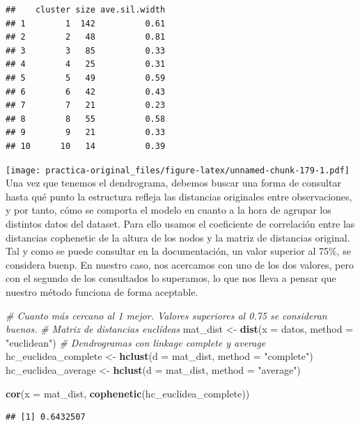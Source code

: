\documentclass[spanish,]{article}
\newenvironment{Shaded}{\begin{snugshade}}{\end{snugshade}}
\newcommand{\KeywordTok}[1]{\textcolor[rgb]{0.13,0.29,0.53}{\textbf{#1}}}
\newcommand{\DataTypeTok}[1]{\textcolor[rgb]{0.13,0.29,0.53}{#1}}
\newcommand{\StringTok}[1]{\textcolor[rgb]{0.31,0.60,0.02}{#1}}
\newcommand{\CommentTok}[1]{\textcolor[rgb]{0.56,0.35,0.01}{\textit{#1}}}
\newcommand{\NormalTok}[1]{#1}
\begin{document}
\begin{verbatim}
##    cluster size ave.sil.width
## 1        1  142          0.61
## 2        2   48          0.81
## 3        3   85          0.33
## 4        4   25          0.31
## 5        5   49          0.59
## 6        6   42          0.43
## 7        7   21          0.23
## 8        8   55          0.58
## 9        9   21          0.33
## 10      10   14          0.39
\end{verbatim}

\texttt{[image: practica-original\_files/figure-latex/unnamed-chunk-179-1.pdf]}
Una vez que tenemos el dendrograma, debemos buscar una forma de
consultar hasta qué punto la estructura refleja las distancias
originales entre observaciones, y por tanto, cómo se comporta el modelo
en cuanto a la hora de agrupar los distintos datos del dataset. Para
ello usamos el coeficiente de correlación entre las distancias
cophenetic de la altura de los nodos y la matriz de distancias original.
Tal y como se puede consultar en la documentación, un valor superior al
75\%, se considera buenp. En nuestro caso, nos acercamos con uno de los
dos valores, pero con el segundo de los consultados lo superamos, lo que
nos lleva a pensar que nuestro método funciona de forma aceptable.

\begin{Shaded}
\begin{Highlighting}[]
\CommentTok{# Cuanto más cercano al 1 mejor. Valores superiores al 0.75 se consideran buenos.}
\CommentTok{# Matriz de distancias euclídeas}
\NormalTok{mat_dist <-}\StringTok{ }\KeywordTok{dist}\NormalTok{(}\DataTypeTok{x =}\NormalTok{ datos, }\DataTypeTok{method =} \StringTok{"euclidean"}\NormalTok{)}
\CommentTok{# Dendrogramas con linkage complete y average}
\NormalTok{hc_euclidea_complete <-}\StringTok{ }\KeywordTok{hclust}\NormalTok{(}\DataTypeTok{d =}\NormalTok{ mat_dist, }\DataTypeTok{method =} \StringTok{"complete"}\NormalTok{)}
\NormalTok{hc_euclidea_average  <-}\StringTok{ }\KeywordTok{hclust}\NormalTok{(}\DataTypeTok{d =}\NormalTok{ mat_dist, }\DataTypeTok{method =} \StringTok{"average"}\NormalTok{)}

\KeywordTok{cor}\NormalTok{(}\DataTypeTok{x =}\NormalTok{ mat_dist, }\KeywordTok{cophenetic}\NormalTok{(hc_euclidea_complete)) }
\end{Highlighting}
\end{Shaded}

\begin{verbatim}
## [1] 0.6432507
\end{verbatim}
\end{document}
